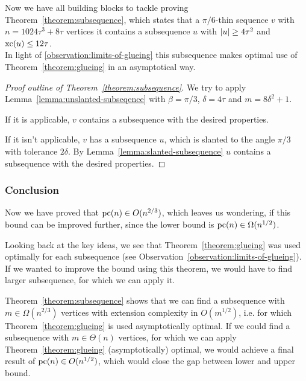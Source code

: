 Now we have all building blocks to tackle proving Theorem~\ref{theorem:subsequence}, which states that a $\pi/6$-thin sequence $v$ with $n = 1024\tau^3 + 8\tau$ vertices it contains a subsequence $u$ with $\lvert u\rvert \geq 4\tau^2$ and $\operatorname{xc}(u) \leq 12\tau$.\\
In light of \ref{observation:limits-of-glueing} this subsequence makes optimal use of Theorem~\ref{theorem:glueing} in an asymptotical way.

\begin{proof}[Proof outline of Theorem~\ref{theorem:subsequence}]
  We try to apply Lemma~\ref{lemma:unslanted-subseqence} with $\beta = \pi/3$, $\delta = 4\tau$ and $m = 8\delta^2 + 1$.

  If it is applicable, $v$ contains a subsequence with the desired properties.

  If it isn't applicable, $v$ has a subsequence $u$, which is slanted to the angle $\pi/3$ with tolerance $2\delta$. By Lemma~\ref{lemma:slanted-subsequence} $u$ contains a subsequence with the desired properties.
\end{proof}



\subsubsection{Conclusion}

Now we have proved that $\operatorname{pc}(n) \in O(n^{2/3})$, which leaves us wondering, if this bound can be improved further, since the lower bound is $\operatorname{pc}(n) \in \Omega(n^{1/2})$.

Looking back at the key ideas, we see that Theorem~\ref{theorem:glueing} was used optimally for each subsequence (see Observation~\ref{observation:limits-of-glueing}). If we wanted to improve the bound using this theorem, we would have to find larger subsequence, for which we can apply it.

Theorem~\ref{theorem:subsequence} shows that we can find a subsequence with $m\in\Omega(n^{2/3})$ vertices with extension complexity in $O(m^{1/2})$, i.e. for which Theorem~\ref{theorem:glueing} is used asymptotically optimal. If we could find a subsequence with $m\in\Theta(n)$ vertices, for which we can apply Theorem~\ref{theorem:glueing} (asymptotically) optimal, we would achieve a final result of $\operatorname{pc}(n)\in O(n^{1/2})$, which would close the gap between lower and upper bound.


